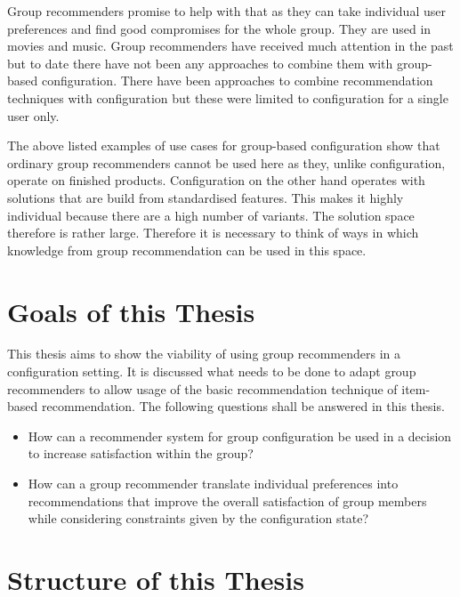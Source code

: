 Group recommenders promise to help with that as they can take individual user preferences and find good compromises for the whole group. They are used in movies and music. Group recommenders have received much attention in the past but to date there have not been any approaches to combine them with group-based configuration. There have been approaches to combine recommendation techniques with configuration but these were limited to configuration for a single user only. 

The above listed examples of use cases for group-based configuration show that ordinary group recommenders cannot be used here as they, unlike configuration, operate on finished products. Configuration on the other hand operates with solutions that are build from standardised features. This makes it highly individual because there are a high number of variants. The solution space therefore is rather large. Therefore it is necessary to think of ways in which knowledge from group recommendation can be used in this space.

\section{Goals of this Thesis}
\label{sec:Introduction:Goals}
This thesis aims to show the viability of using group recommenders in a configuration setting. It is discussed what needs to be done to adapt group recommenders to allow usage of the basic recommendation technique of item-based recommendation. The following questions shall be answered in this thesis.

\begin{itemize}
    \item How can a recommender system for group configuration be used in a decision to increase satisfaction within the group?
    \item How can a group recommender translate individual preferences into recommendations that improve the overall satisfaction of group members while considering constraints given by the configuration state? 
\end{itemize}


\section{Structure of this Thesis}
\label{sec:Introduction:Structure}


\pagebreak

